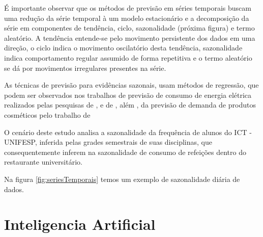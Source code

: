 \documentclass[	12pt, Times, openright, twoside, a4paper, english, brazil]{abntex2}
\begin{document}
          É importante observar que os métodos de previsão em séries temporais buscam uma redução da série temporal à um modelo estacionário e a decomposição da série em componentes de tendência, ciclo, sazonalidade (próxima figura) e termo aleatório. A tendência entende-se pelo movimento persistente dos dados em uma direção, o ciclo indica o movimento oscilatório desta tendência, sazonalidade indica comportamento regular assumido de forma repetitiva e o termo aleatório se dá por movimentos irregulares presentes na série.
           
          As técnicas de previsão para evidências sazonais, usam métodos de regressão, que podem ser observados nos trabalhos de previsão de consumo de energia elétrica realizados pelas pesquisas de \cite{Almeida2013}, \cite{RUAS2012} e de \cite{Silva2010}, além , da previsão de demanda de produtos cosméticos pelo trabalho de \cite{Junior2007}

          O cenário deste estudo analisa a sazonalidade da frequência de alunos do ICT - UNIFESP, inferida pelas grades semestrais de suas disciplinas, que consequentemente inferem na sazonalidade de consumo de refeições dentro do restaurante universitário.\newline
          
          Na figura \ref{fig:seriesTemporais} temos um exemplo de sazonalidade diária de dados.

          \begin{figure}[H]
          \end{figure}

      \section{Inteligencia Artificial}
\end{document}
